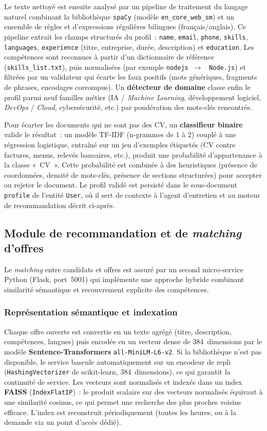Le texte nettoyé est ensuite analysé par un pipeline de traitement du langage naturel combinant
la bibliothèque \texttt{spaCy} (modèle \texttt{en\_core\_web\_sm}) et un ensemble de règles et
d'expressions régulières bilingues (français/anglais). Ce pipeline extrait les champs
structurés du profil~: \texttt{name}, \texttt{email}, \texttt{phone}, \texttt{skills},
\texttt{languages}, \texttt{experience} (titre, entreprise, durée, description) et
\texttt{education}. Les compétences sont reconnues à partir d'un dictionnaire de référence
(\texttt{skills\_list.txt}), puis normalisées (par exemple \texttt{nodejs}~$\rightarrow$~%
\texttt{Node.js}) et filtrées par un validateur qui écarte les faux positifs (mots génériques,
fragments de phrases, encodages corrompus). Un \textbf{détecteur de domaine} classe enfin le
profil parmi neuf familles métier (IA / \textit{Machine Learning}, développement logiciel,
\textit{DevOps} / \textit{Cloud}, cybersécurité, etc.) par pondération des mots-clés rencontrés.

Pour écarter les documents qui ne sont pas des CV, un \textbf{classifieur binaire} valide le
résultat~: un modèle TF-IDF (n-grammes de 1 à 2) couplé à une régression logistique, entraîné
sur un jeu d'exemples étiquetés (CV contre factures, menus, relevés bancaires, etc.), produit
une probabilité d'appartenance à la classe «~CV~». Cette probabilité est combinée à des
heuristiques (présence de coordonnées, densité de mots-clés, présence de sections structurées)
pour accepter ou rejeter le document. Le profil validé est persisté dans le sous-document
\texttt{profile} de l'entité \texttt{User}, où il sert de contexte à l'agent d'entretien et au
moteur de recommandation décrit ci-après.

\subsection{Module de recommandation et de \textit{matching} d'offres}

Le \textit{matching} entre candidats et offres est assuré par un second micro-service Python
(Flask, port~5001) qui implémente une approche hybride combinant similarité sémantique et
recouvrement explicite des compétences.

\subsubsection{Représentation sémantique et indexation}

Chaque offre ouverte est convertie en un texte agrégé (titre, description, compétences,
langues) puis encodée en un vecteur dense de 384~dimensions par le modèle
\textbf{Sentence-Transformers} \texttt{all-MiniLM-L6-v2}. Si la bibliothèque n'est pas
disponible, le service bascule automatiquement sur un encodeur de repli
(\texttt{HashingVectorizer} de scikit-learn, 384~dimensions), ce qui garantit la continuité de
service. Les vecteurs sont normalisés et indexés dans un index \textbf{FAISS}
(\texttt{IndexFlatIP})~: le produit scalaire sur des vecteurs normalisés équivaut à une
similarité cosinus, ce qui permet une recherche des plus proches voisins efficace. L'index est
reconstruit périodiquement (toutes les heures, ou à la demande via un point d'accès dédié).

